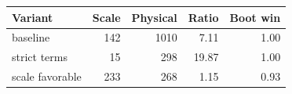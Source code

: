 \begin{tabular}{lrrrr}
\toprule
Variant & Scale & Physical & Ratio & Boot win \\
\midrule
baseline & 142 & 1010 & 7.11 & 1.00 \\
strict terms & 15 & 298 & 19.87 & 1.00 \\
scale favorable & 233 & 268 & 1.15 & 0.93 \\
\bottomrule
\end{tabular}
